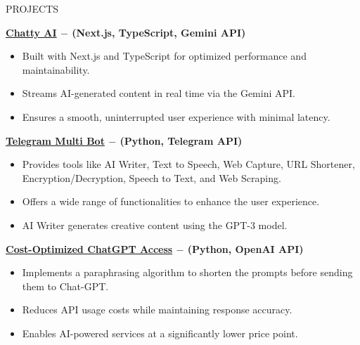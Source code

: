 \documentclass{resume} %
\begin{document}
\begin{rSection}{PROJECTS}
\vspace{-1.25em}

\item \textbf{\href{https://github.com/jackwaghan/Chatty-AI}{Chatty AI} \(-\) (Next.js, TypeScript, Gemini API)}  
    \begin{itemize}
        \item Built with Next.js and TypeScript for optimized performance and maintainability.  
        \item Streams AI-generated content in real time via the Gemini API.  
        \item Ensures a smooth, uninterrupted user experience with minimal latency.  
    \end{itemize}  
\end{rSection}

\item \textbf{\href{https://github.com/jackwaghan/Telegram-Multi-Bot}{Telegram Multi Bot} \(-\) (Python, Telegram API)}  
    \begin{itemize}
        \item Provides tools like AI Writer, Text to Speech, Web Capture, URL Shortener, Encryption/Decryption, Speech to Text, and Web Scraping.  
        \item Offers a wide range of functionalities to enhance the user experience.
        \item AI Writer generates creative content using the GPT-3 model.
    \end{itemize}  
    

\item \textbf{\href{https://github.com/jackwaghan/ChatGPT-AT-Low-Cost}{Cost-Optimized ChatGPT Access} \(-\) (Python, OpenAI API)}
    \begin{itemize}
        \item Implements a paraphrasing algorithm to shorten the prompts before sending them to Chat-GPT.  
        \item Reduces API usage costs while maintaining response accuracy.  
        \item Enables AI-powered services at a significantly lower price point.  
    \end{itemize}  
\end{document}
